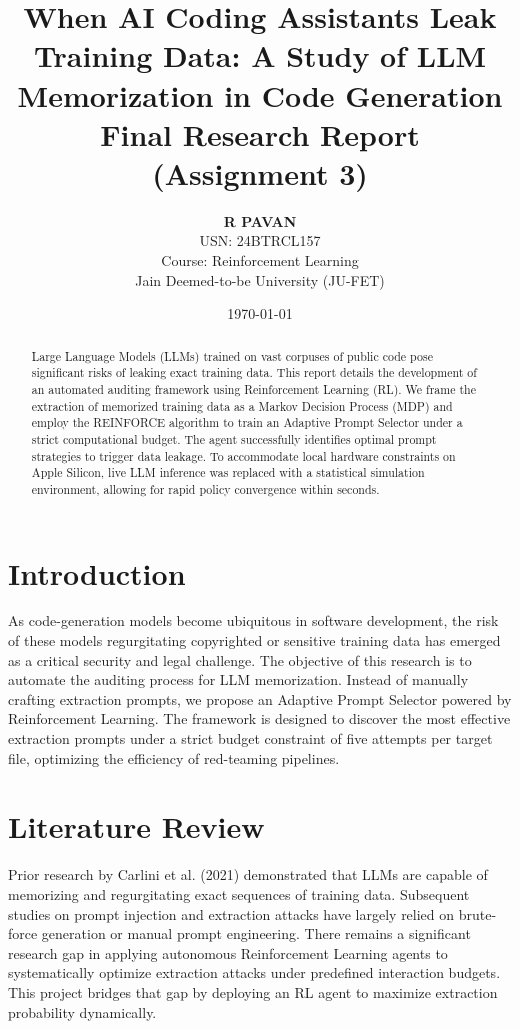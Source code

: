 \documentclass[11pt, a4paper]{article}
\title{\textbf{When AI Coding Assistants Leak Training Data: A Study of LLM Memorization in Code Generation}\\
\large Final Research Report (Assignment 3)}
\author{
    \textbf{R PAVAN} \\
    USN: 24BTRCL157 \\
    Course: Reinforcement Learning \\
    Jain Deemed-to-be University (JU-FET)
}
\date{\today}
\begin{document}
\maketitle

\begin{abstract}
Large Language Models (LLMs) trained on vast corpuses of public code pose significant risks of leaking exact training data. This report details the development of an automated auditing framework using Reinforcement Learning (RL). We frame the extraction of memorized training data as a Markov Decision Process (MDP) and employ the REINFORCE algorithm to train an Adaptive Prompt Selector under a strict computational budget. The agent successfully identifies optimal prompt strategies to trigger data leakage. To accommodate local hardware constraints on Apple Silicon, live LLM inference was replaced with a statistical simulation environment, allowing for rapid policy convergence within seconds.
\end{abstract}

\section{Introduction}
As code-generation models become ubiquitous in software development, the risk of these models regurgitating copyrighted or sensitive training data has emerged as a critical security and legal challenge. The objective of this research is to automate the auditing process for LLM memorization. Instead of manually crafting extraction prompts, we propose an Adaptive Prompt Selector powered by Reinforcement Learning. The framework is designed to discover the most effective extraction prompts under a strict budget constraint of five attempts per target file, optimizing the efficiency of red-teaming pipelines.

\section{Literature Review}
Prior research by Carlini et al. (2021) demonstrated that LLMs are capable of memorizing and regurgitating exact sequences of training data. Subsequent studies on prompt injection and extraction attacks have largely relied on brute-force generation or manual prompt engineering. There remains a significant research gap in applying autonomous Reinforcement Learning agents to systematically optimize extraction attacks under predefined interaction budgets. This project bridges that gap by deploying an RL agent to maximize extraction probability dynamically.
\end{document}
